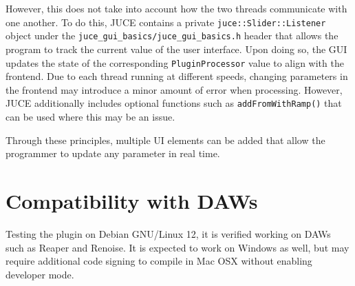 \begin{singlespace}

\end{singlespace} \hfill \break
\hspace*{0.6cm}However, this does not take into account how the two threads communicate with one another. To do this, JUCE contains a private \verb|juce::Slider::Listener| object under the \verb|juce_gui_basics/juce_gui_basics.h| header that allows the program to track the current value of the user interface. Upon doing so, the GUI updates the state of the corresponding \verb|PluginProcessor| value to align with the frontend. Due to each thread running at different speeds, changing parameters in the frontend may introduce a minor amount of error when processing. However, JUCE additionally includes optional functions such as \verb|addFromWithRamp()| that can be used where this may be an issue.

\begin{singlespace}

\end{singlespace} \hfill \break
\hspace*{0.6cm} Through these principles, multiple UI elements can be added that allow the programmer to update any parameter in real time.

\section{Compatibility with DAWs}
Testing the plugin on Debian GNU/Linux 12, it is verified working on DAWs such as Reaper and Renoise. It is expected to work on Windows as well, but may require additional code signing to compile in Mac OSX without enabling developer mode.

